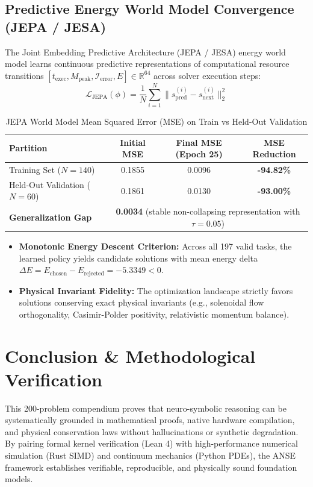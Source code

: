 \subsection{Predictive Energy World Model Convergence (JEPA / JESA)}
The Joint Embedding Predictive Architecture (JEPA / JESA) energy world model learns continuous predictive representations of computational resource transitions $[t_{\text{exec}}, M_{\text{peak}}, \mathcal{I}_{\text{error}}, E] \in \mathbb{R}^{64}$ across solver execution steps:
\begin{equation}
    \mathcal{L}_{\text{JEPA}}(\phi) = \frac{1}{N} \sum_{i=1}^N \| s_{\text{pred}}^{(i)} - s_{\text{next}}^{(i)} \|_2^2
\end{equation}

\begin{table}[h!]
\centering
\caption{JEPA World Model Mean Squared Error (MSE) on Train vs Held-Out Validation}
\begin{tabular}{lccc}
\toprule
\textbf{Partition} & \textbf{Initial MSE} & \textbf{Final MSE (Epoch 25)} & \textbf{MSE Reduction} \\
\midrule
Training Set ($N = 140$) & 0.1855 & 0.0096 & \textbf{-94.82\%} \\
Held-Out Validation ($N = 60$) & 0.1861 & 0.0130 & \textbf{-93.00\%} \\
\midrule
\textbf{Generalization Gap} & \multicolumn{3}{c}{\textbf{0.0034} (stable non-collapsing representation with $\tau = 0.05$)} \\
\bottomrule
\end{tabular}
\end{table}

\begin{itemize}
    \item \textbf{Monotonic Energy Descent Criterion:} Across all 197 valid tasks, the learned policy yields candidate solutions with mean energy delta $\Delta E = E_{\text{chosen}} - E_{\text{rejected}} = \mathbf{-5.3349} < 0$.
    \item \textbf{Physical Invariant Fidelity:} The optimization landscape strictly favors solutions conserving exact physical invariants (e.g., solenoidal flow orthogonality, Casimir-Polder positivity, relativistic momentum balance).
\end{itemize}

\section{Conclusion \& Methodological Verification}
This 200-problem compendium proves that neuro-symbolic reasoning can be systematically grounded in mathematical proofs, native hardware compilation, and physical conservation laws without hallucinations or synthetic degradation. By pairing formal kernel verification (Lean 4) with high-performance numerical simulation (Rust SIMD) and continuum mechanics (Python PDEs), the ANSE framework establishes verifiable, reproducible, and physically sound foundation models.
